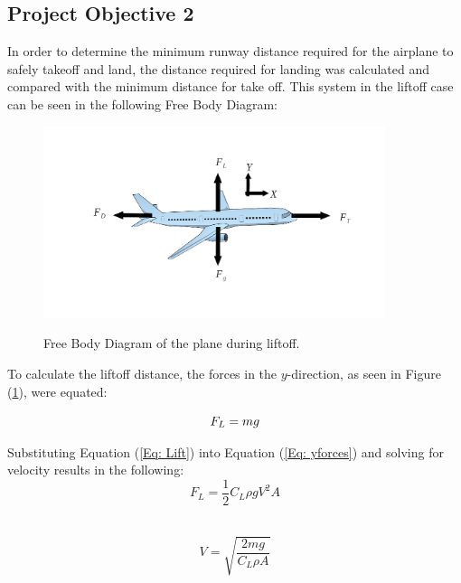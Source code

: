 \documentclass[
	12pt, %
]{fluids_report_style}
\begin{document}
\subsection{Project Objective 2}
In order to determine the minimum runway distance required for the airplane to safely takeoff and land, the distance required for landing was calculated and compared with the minimum distance for take off. This system in the liftoff case can be seen in the following Free Body Diagram:

\begin{figure}[ht!]
    \centering
    {\includegraphics[width=10cm]{figures/fbd_1.png}}%
    \caption{Free Body Diagram of the plane during liftoff.}
    \label{fig:liftoff}
\end{figure}  

\noindent To calculate the liftoff distance, the forces in the $y$-direction, as seen in Figure (\ref{fig:liftoff}), were equated:

\begin{equation}
    F_L = mg \\
    \label{Eq: yforces}
\end{equation}
\vspace{.5mm}

\noindent Substituting Equation (\ref{Eq: Lift}) into Equation (\ref{Eq: yforces}) and solving for velocity results in the following:\\

\begin{equation} \label{Eq: Lift}
    F_L = \frac{1}{2} C_L \rho g V^2 A
\end{equation} \\
\vspace{.5mm}

\begin{equation}
        V = \sqrt{\frac{2mg}{C_{L}\rho A}}
        \label{Eq: iterate_condition}
\end{equation}  \\
\end{document}
